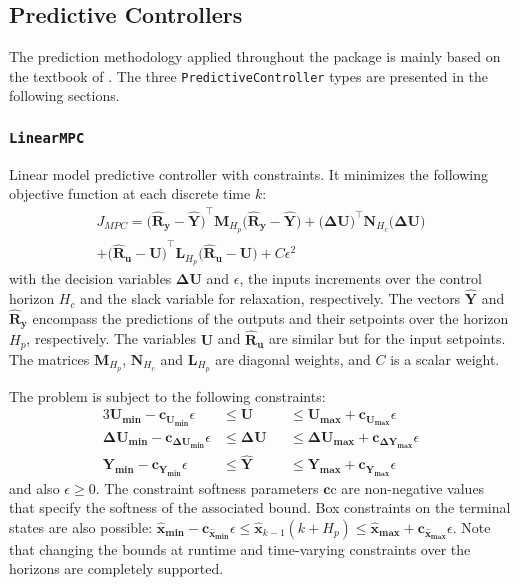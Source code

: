 \subsection{Predictive Controllers}

The prediction methodology applied throughout the package is mainly based on the textbook of \citet{mpcMac}. The three \texttt{PredictiveController} types are presented in the following sections.

\subsubsection{\textnormal{\texttt{LinearMPC}}}
Linear model predictive controller with constraints. It minimizes the following objective function at each discrete time $k$:
\begin{multline}
J_{\mathit{MPC}} = 
    \mathbf{\big(\hat{R}_y - \hat{Y}\big)}^\intercal \mathbf{M}_{H_p} \mathbf{\big(\hat{R}_y - \hat{Y}\big)}   
    + \mathbf{\big(ΔU\big)}^\intercal \mathbf{N}_{H_c} \mathbf{\big(ΔU\big)} \\
    + \mathbf{\big(\hat{R}_u - U\big)}^\intercal \mathbf{L}_{H_p} \mathbf{\big(\hat{R}_u - U\big)} 
    + C \epsilon^2
\end{multline}
with the decision variables $\mathbf{ΔU}$ and $\epsilon$, the inputs increments over the control horizon $H_c$ and the slack variable for relaxation, respectively. The vectors $\mathbf{\hat{Y}}$ and $\mathbf{\hat{R}_y}$ encompass the predictions of the outputs and their setpoints over the horizon $H_p$, respectively. The variables $\mathbf{U}$ and $\mathbf{\hat{R}_u}$ are similar but for the input setpoints. The matrices $\mathbf{M}_{H_p}$, $\mathbf{N}_{H_c}$ and $\mathbf{L}_{H_p}$ are diagonal weights, and $C$ is a scalar weight. 

The problem is subject to the following constraints:
\begin{alignat}{3}
    \mathbf{U_{min}  - c_{U_{min}}}  \epsilon &\le \mathbf{U}  &&\le \mathbf{U_{max}  + c_{U_{max}}}  \epsilon \\
    \mathbf{ΔU_{min} - c_{ΔU_{min}}} \epsilon &\le \mathbf{ΔU} &&\le \mathbf{ΔU_{max} + c_{ΔY_{max}}} \epsilon \\
    \mathbf{Y_{min}  - c_{Y_{min}}}  \epsilon &\le \mathbf{\hat{Y}} &&\le \mathbf{Y_{max}  + c_{Y_{max}}}  \epsilon
\end{alignat}
and also $\epsilon \ge 0$. The constraint softness parameters $\mathbf{c}$c are non-negative values that specify the softness of the associated bound. Box constraints on the terminal states are also possible: $\mathbf{\hat{x}_{min}} - \mathbf{c_{\hat{x}_{min}}}\epsilon \le \mathbf{\hat{x}}_{k-1}(k+H_p) \le \mathbf{\hat{x}_{max}} + \mathbf{c_{\hat{x}_{max}}}\epsilon$. Note that changing the bounds at runtime and time-varying constraints over the horizons are
completely supported.

